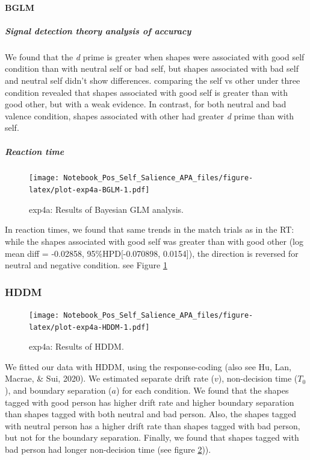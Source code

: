 \documentclass[
  english,
  man]{apa6}
\let\oldparagraph\paragraph
\renewcommand{\paragraph}[1]{\oldparagraph{#1}\mbox{}}
\let\oldsubparagraph\subparagraph
\renewcommand{\subparagraph}[1]{\oldsubparagraph{#1}\mbox{}}
\begin{document}
\hypertarget{bglm-5}{%
\paragraph{BGLM}\label{bglm-5}}

\hypertarget{signal-detection-theory-analysis-of-accuracy-7}{%
\subparagraph{Signal detection theory analysis of accuracy}\label{signal-detection-theory-analysis-of-accuracy-7}}

We found that the \emph{d} prime is greater when shapes were associated with good self condition than with neutral self or bad self, but shapes associated with bad self and neutral self didn't show differences. comparing the self vs other under three condition revealed that shapes associated with good self is greater than with good other, but with a weak evidence. In contrast, for both neutral and bad valence condition, shapes associated with other had greater \emph{d} prime than with self.

\hypertarget{reaction-time-11}{%
\subparagraph{Reaction time}\label{reaction-time-11}}

\begin{figure}
\centering
\texttt{[image: Notebook\_Pos\_Self\_Salience\_APA\_files/figure-latex/plot-exp4a-BGLM-1.pdf]}
\caption{\label{fig:plot-exp4a-BGLM}exp4a: Results of Bayesian GLM analysis.}
\end{figure}

In reaction times, we found that same trends in the match trials as in the RT: while the shapes associated with good self was greater than with good other (log mean diff = -0.02858, 95\%HPD{[}-0.070898, 0.0154{]}), the direction is reversed for neutral and negative condition. see Figure \ref{fig:plot-exp4a-BGLM}

\hypertarget{hddm-8}{%
\subsubsection{HDDM}\label{hddm-8}}

\begin{figure}
\centering
\texttt{[image: Notebook\_Pos\_Self\_Salience\_APA\_files/figure-latex/plot-exp4a-HDDM-1.pdf]}
\caption{\label{fig:plot-exp4a-HDDM}exp4a: Results of HDDM.}
\end{figure}

We fitted our data with HDDM, using the response-coding (also see Hu, Lan, Macrae, \& Sui, 2020). We estimated separate drift rate (\(v\)), non-decision time (\(T_{0}\)), and boundary separation (\(a\)) for each condition. We found that the shapes tagged with good person has higher drift rate and higher boundary separation than shapes tagged with both neutral and bad person. Also, the shapes tagged with neutral person has a higher drift rate than shapes tagged with bad person, but not for the boundary separation. Finally, we found that shapes tagged with bad person had longer non-decision time (see figure \ref{fig:plot-exp4a-HDDM})).
\end{document}
